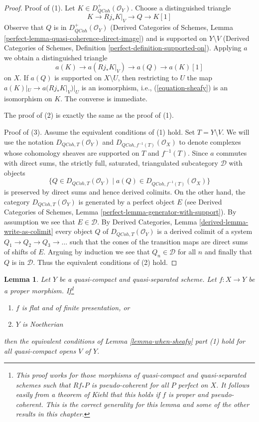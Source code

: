 \documentclass{stacks-project}
\theoremstyle{plain}
\newtheorem{lemma}[subsection]{Lemma}
\theoremstyle{definition}
\theoremstyle{remark}
\numberwithin{equation}{subsection}
\def\QCoh{\mathit{QCoh}}
\begin{document}
\begin{proof}
Proof of (1). Let $K \in D_\QCoh^+(\mathcal{O}_Y)$.
Choose a distinguished triangle
$$
K \to Rj_*K|_V \to Q \to K[1]
$$
Observe that $Q$ is in $D_\QCoh^+(\mathcal{O}_Y)$
(Derived Categories of Schemes, Lemma
\ref{perfect-lemma-quasi-coherence-direct-image})
and is supported on $Y \setminus V$
(Derived Categories of Schemes, Definition
\ref{perfect-definition-supported-on}).
Applying $a$ we obtain a distinguished triangle
$$
a(K) \to a(Rj_*K|_V) \to a(Q) \to a(K)[1]
$$
on $X$. If $a(Q)$ is supported on $X \setminus U$, then
restricting to $U$ the map $a(K)|_U \to a(Rj_*K|_V)|_U$ is an
isomorphism, i.e., (\ref{equation-sheafy}) is an isomorphism on $K$.
The converse is immediate.

\medskip\noindent
The proof of (2) is exactly the same as the proof of (1).

\medskip\noindent
Proof of (3). Assume the equivalent conditions of (1) hold.
Set $T = Y \setminus V$.
We will use the notation $D_{\QCoh, T}(\mathcal{O}_Y)$ and
$D_{\QCoh, f^{-1}(T)}(\mathcal{O}_X)$ to denote complexes
whose cohomology sheaves are supported on $T$ and $f^{-1}(T)$.
Since $a$ commutes with direct sums, the strictly full, saturated, triangulated
subcategory $\mathcal{D}$ with objects
$$
\{Q \in D_{\QCoh, T}(\mathcal{O}_Y) \mid
a(Q) \in D_{\QCoh, f^{-1}(T)}(\mathcal{O}_X)\}
$$
is preserved by direct sums and hence derived colimits.
On the other hand, the category $D_{\QCoh, T}(\mathcal{O}_Y)$
is generated by a perfect object $E$
(see Derived Categories of Schemes, Lemma
\ref{perfect-lemma-generator-with-support}).
By assumption we see that $E \in \mathcal{D}$.
By Derived Categories, Lemma \ref{derived-lemma-write-as-colimit}
every object $Q$ of $D_{\QCoh, T}(\mathcal{O}_Y)$ is a derived
colimit of a system $Q_1 \to Q_2 \to Q_3 \to \ldots$
such that the cones of the transition maps are direct sums
of shifts of $E$. Arguing by induction we see that
$Q_n \in \mathcal{D}$ for all $n$ and finally that $Q$ is
in $\mathcal{D}$. Thus the equivalent conditions of (2) hold.
\end{proof}

\begin{lemma}
\label{lemma-proper-noetherian}
Let $Y$ be a quasi-compact and quasi-separated scheme.
Let $f : X \to Y$ be a proper morphism. If\footnote{This proof works for those
morphisms of quasi-compact and quasi-separated schemes such that
$Rf_*P$ is pseudo-coherent for all $P$ perfect on $X$. It follows
easily from a theorem of Kiehl \cite{Kiehl} that this holds if
$f$ is proper and pseudo-coherent. This is the correct generality
for this lemma and some of the other results in this chapter.}
\begin{enumerate}
\item $f$ is flat and of finite presentation, or
\item $Y$ is Noetherian
\end{enumerate}
then the equivalent conditions of Lemma \ref{lemma-when-sheafy} part (1)
hold for all quasi-compact opens $V$ of $Y$.
\end{lemma}
\end{document}

